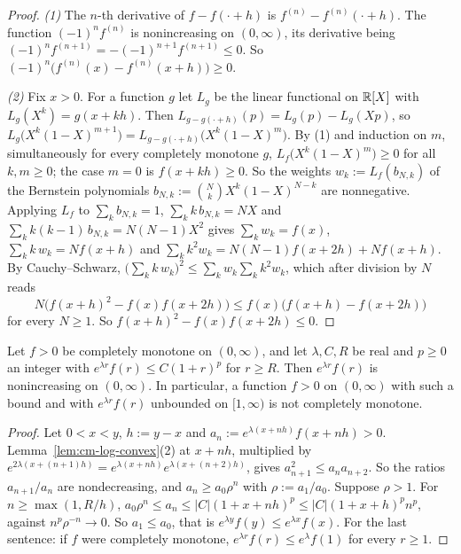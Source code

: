 \begin{proof}
\emph{(1)} The $n$-th derivative of $f - f(\cdot + h)$ is $f^{(n)} - f^{(n)}(\cdot + h)$. The function
$(-1)^nf^{(n)}$ is nonincreasing on $(0, \infty)$, its derivative being
$(-1)^nf^{(n+1)} = -(-1)^{n+1}f^{(n+1)} \le 0$. So $(-1)^n\bigl(f^{(n)}(x) - f^{(n)}(x + h)\bigr) \ge 0$.

\emph{(2)} Fix $x > 0$. For a function $g$ let $L_g$ be the linear functional on $\mathbb{R}[X]$ with
$L_g(X^k) = g(x + kh)$. Then $L_{g - g(\cdot + h)}(p) = L_g(p) - L_g(Xp)$, so
$L_g\bigl(X^k(1 - X)^{m+1}\bigr) = L_{g - g(\cdot + h)}\bigl(X^k(1 - X)^m\bigr)$. By (1) and induction on
$m$, simultaneously for every completely monotone $g$, $L_f\bigl(X^k(1 - X)^m\bigr) \ge 0$ for all
$k, m \ge 0$; the case $m = 0$ is $f(x + kh) \ge 0$. So the weights $w_k := L_f(b_{N,k})$ of the
Bernstein polynomials $b_{N,k} := \binom NkX^k(1 - X)^{N-k}$ are nonnegative. Applying $L_f$ to
$\sum_kb_{N,k} = 1$, $\sum_kk\,b_{N,k} = NX$ and $\sum_kk(k - 1)\,b_{N,k} = N(N - 1)X^2$ gives
$\sum_kw_k = f(x)$, $\sum_kk\,w_k = Nf(x + h)$ and $\sum_kk^2w_k = N(N - 1)f(x + 2h) + Nf(x + h)$. By
Cauchy--Schwarz, $\bigl(\sum_kk\,w_k\bigr)^2 \le \sum_kw_k\sum_kk^2w_k$, which after division by $N$
reads
\[
  N\bigl(f(x + h)^2 - f(x)f(x + 2h)\bigr) \le f(x)\bigl(f(x + h) - f(x + 2h)\bigr)
\]
for every $N \ge 1$. So $f(x + h)^2 - f(x)f(x + 2h) \le 0$.
\end{proof}

\begin{lemma}
\label{lem:cm-exponential-rate}

Let $f > 0$ be completely monotone on $(0, \infty)$, and let $\lambda, C, R$ be real and $p \ge 0$ an
integer with $e^{\lambda r}f(r) \le C(1 + r)^p$ for $r \ge R$. Then $e^{\lambda r}f(r)$ is
nonincreasing on $(0, \infty)$. In particular, a function $f > 0$ on $(0, \infty)$ with such a bound
and with $e^{\lambda r}f(r)$ unbounded on $[1, \infty)$ is not completely monotone.
\end{lemma}

\begin{proof}
Let $0 < x < y$, $h := y - x$ and $a_n := e^{\lambda(x + nh)}f(x + nh) > 0$.
Lemma~\ref{lem:cm-log-convex}(2) at $x + nh$, multiplied by
$e^{2\lambda(x + (n+1)h)} = e^{\lambda(x + nh)}e^{\lambda(x + (n+2)h)}$, gives
$a_{n+1}^2 \le a_na_{n+2}$. So the ratios $a_{n+1}/a_n$ are nondecreasing, and
$a_n \ge a_0\rho^n$ with $\rho := a_1/a_0$. Suppose $\rho > 1$. For $n \ge \max(1, R/h)$,
$a_0\rho^n \le a_n \le |C|(1 + x + nh)^p \le |C|(1 + x + h)^pn^p$, against $n^p\rho^{-n} \to 0$. So
$a_1 \le a_0$, that is $e^{\lambda y}f(y) \le e^{\lambda x}f(x)$. For the last sentence: if $f$ were
completely monotone, $e^{\lambda r}f(r) \le e^\lambda f(1)$ for every $r \ge 1$.
\end{proof}

